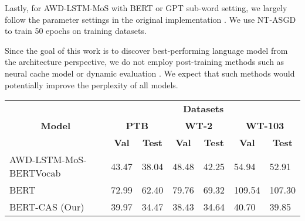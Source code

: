 \documentclass[11pt,a4paper]{article}
\begin{document}
Lastly, for AWD-LSTM-MoS with BERT or GPT sub-word setting, we largely follow the parameter settings in the original implementation \cite{Yang03953}. We use NT-ASGD \cite{Merity02182} to train 50 epochs on training datasets.

Since the goal of this work is to discover best-performing language model from the architecture perspective, we do not employ post-training methods such as neural cache model \cite{GraveJU16} or dynamic evaluation \cite{KrauseK0R18}. We expect that such methods would potentially improve the perplexity of all models.


\begin{table*}[t!]
\centering
\begin{tabular}{|l|l|l|l|l|l|l|}
\hline
\multicolumn{1}{|c|}{\multirow{3}{*}{\textbf{Model}}} & \multicolumn{6}{c|}{\textbf{Datasets}}                                                                                                                                                                                   \\ \cline{2-7} 
\multicolumn{1}{|c|}{}                                & \multicolumn{2}{c|}{\textbf{PTB}}                                      & \multicolumn{2}{c|}{\textbf{WT-2}}                                     & \multicolumn{2}{c|}{\textbf{WT-103}}                                   \\ \cline{2-7} 
\multicolumn{1}{|c|}{}                                & \multicolumn{1}{c|}{\textbf{Val}} & \multicolumn{1}{c|}{\textbf{Test}} & \multicolumn{1}{c|}{\textbf{Val}} & \multicolumn{1}{c|}{\textbf{Test}} & \multicolumn{1}{c|}{\textbf{Val}} & \multicolumn{1}{c|}{\textbf{Test}} \\ \hline
AWD-LSTM-MoS-BERTVocab                                & 43.47                             & 38.04                              & 48.48                             & 42.25                              & 54.94                             & 52.91                              \\ \hline
BERT                                      & 72.99                             & 62.40                              & 79.76                             & 69.32                              & 109.54                            & 107.30                             \\ \hline
BERT-CAS (Our)                          & 39.97                    & 34.47                     & 38.43                    & 34.64                     & 40.70                   & 39.85                     \\ \hline 

\end{tabular}
\end{table*}
\end{document}
